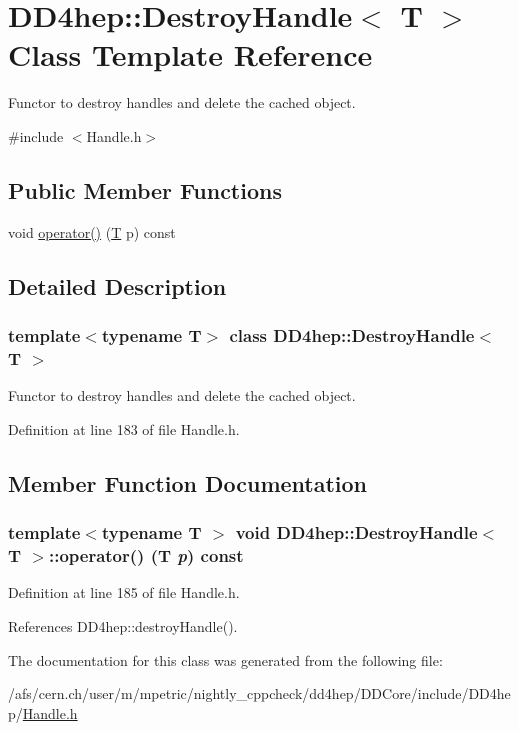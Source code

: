 \hypertarget{class_d_d4hep_1_1_destroy_handle}{
\section{DD4hep::DestroyHandle$<$ T $>$ Class Template Reference}
\label{class_d_d4hep_1_1_destroy_handle}
}


Functor to destroy handles and delete the cached object.  


{\ttfamily \#include $<$Handle.h$>$}\subsection*{Public Member Functions}
\begin{DoxyCompactItemize}
\item 
void \hyperlink{class_d_d4hep_1_1_destroy_handle_acc685503076eb8ec0c8adfcf2f51d549}{operator()} (\hyperlink{class_t}{T} p) const 
\end{DoxyCompactItemize}


\subsection{Detailed Description}
\subsubsection*{template$<$typename T$>$ class DD4hep::DestroyHandle$<$ T $>$}

Functor to destroy handles and delete the cached object. 

Definition at line 183 of file Handle.h.

\subsection{Member Function Documentation}
\hypertarget{class_d_d4hep_1_1_destroy_handle_acc685503076eb8ec0c8adfcf2f51d549}{
\subsubsection[{operator()}]{\setlength{\rightskip}{0pt plus 5cm}template$<$typename T $>$ void {\bf DD4hep::DestroyHandle}$<$ {\bf T} $>$::operator() ({\bf T} {\em p}) const}}
\label{class_d_d4hep_1_1_destroy_handle_acc685503076eb8ec0c8adfcf2f51d549}


Definition at line 185 of file Handle.h.

References DD4hep::destroyHandle().

The documentation for this class was generated from the following file:\begin{DoxyCompactItemize}
\item 
/afs/cern.ch/user/m/mpetric/nightly\_\-cppcheck/dd4hep/DDCore/include/DD4hep/\hyperlink{_handle_8h}{Handle.h}\end{DoxyCompactItemize}
